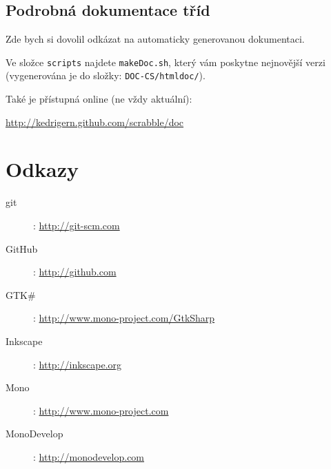 \documentclass[a4paper]{article}
\begin{document}
\subsection{Podrobná dokumentace tříd}
Zde bych si dovolil odkázat na automaticky generovanou dokumentaci. 

Ve složce \texttt{scripts} najdete \texttt{makeDoc.sh}, který vám poskytne nejnovější verzi (vygenerována je do složky: \texttt{DOC-CS/htmldoc/}). 

Také je přístupná online (ne vždy aktuální):

\href{http://kedrigern.github.com/scrabble/doc}{http://kedrigern.github.com/scrabble/doc}

\section{Odkazy}
\begin{description}
\item[git]: \href{http://git-scm.com}{http://git-scm.com}
\item[GitHub]: \href{http://github.com}{http://github.com}
\item[GTK\#]: \href{http://www.mono-project.com/GtkSharp}{http://www.mono-project.com/GtkSharp}
\item[Inkscape]: \href{http://inkscape.org}{http://inkscape.org}
\item[Mono]: \href{http://www.mono-project.com}{http://www.mono-project.com}
\item[MonoDevelop]: \href{http://monodevelop.com}{http://monodevelop.com}
\end{description}
\end{document}
